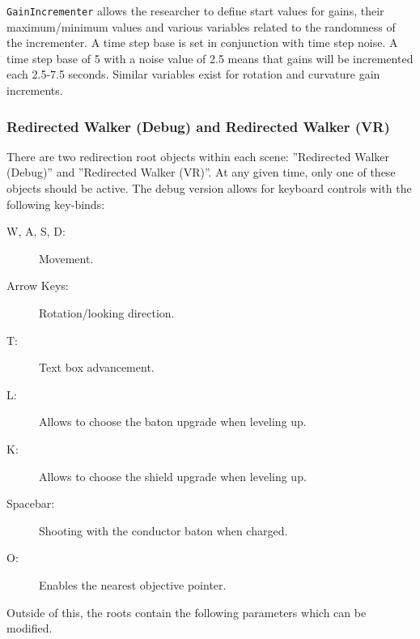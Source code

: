 \lstinline{GainIncrementer} allows the researcher to define start values for gains, their maximum/minimum values and various variables related to the randomness of the incrementer. A time step base is set in conjunction with time step noise. A time step base of 5 with a noise value of 2.5 means that gains will be incremented each 2.5-7.5 seconds. Similar variables exist for rotation and curvature gain increments.

\subsubsection{Redirected Walker (Debug) and Redirected Walker (VR)}
There are two redirection root objects within each scene: ''Redirected Walker (Debug)'' and ''Redirected Walker (VR)''. At any given time, only one of these objects should be active. The debug version allows for keyboard controls with the following key-binds:

\begin{description}
   \item[W, A, S, D:] Movement.
   \item[Arrow Keys:] Rotation/looking direction.
   \item[T:] Text box advancement.
   \item[L:] Allows to choose the baton upgrade when leveling up.
   \item[K:] Allows to choose the shield upgrade when leveling up.
   \item[Spacebar:] Shooting with the conductor baton when charged. 
   \item[O:] Enables the nearest objective pointer. 
\end{description}

Outside of this, the roots contain the following parameters which can be modified.

